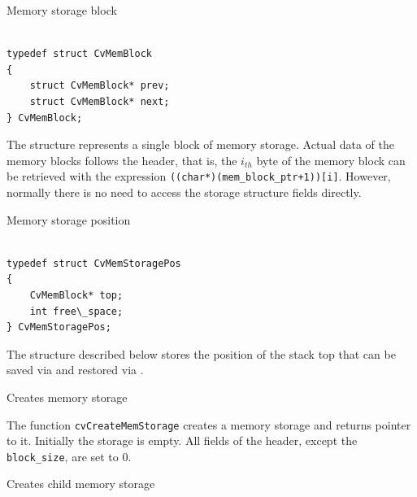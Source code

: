 \label{CvMemBlock}

Memory storage block

\begin{lstlisting}

typedef struct CvMemBlock
{
    struct CvMemBlock* prev;
    struct CvMemBlock* next;
} CvMemBlock;

\end{lstlisting}

The structure  represents a single block of memory
storage. Actual data of the memory blocks follows the header, that is,
the $i_{th}$ byte of the memory block can be retrieved with the expression
\texttt{((char*)(mem\_block\_ptr+1))[i]}. However, normally there is no need
to access the storage structure fields directly.

\label{CvMemStoragePos}

Memory storage position

\begin{lstlisting}

typedef struct CvMemStoragePos
{
    CvMemBlock* top;
    int free\_space;
} CvMemStoragePos;

\end{lstlisting}

The structure described below stores the position of the stack top that can be saved via  and restored via .

\label{CreateMemStorage}

Creates memory storage


\begin{description}
\end{description}

The function \texttt{cvCreateMemStorage} creates a memory storage and returns pointer to it. Initially the storage is empty. All fields of the header, except the \texttt{block\_size}, are set to 0.


\label{CreateChildMemStorage}

Creates child memory storage

